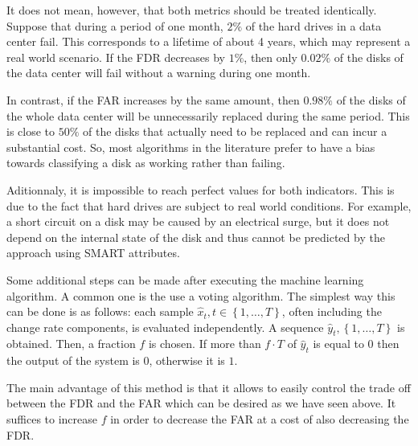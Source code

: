 It does not mean, however, that both metrics should be treated identically.
Suppose that during a period of one month, $2\%$ of the hard drives in a data center fail.
This corresponds to a lifetime of about 4 years, which may represent a real world scenario.
If the FDR decreases by $1\%$, then only $0.02\%$ of the disks of the data center will fail without a warning during one month.

In contrast, if the FAR increases by the same amount, then $0.98\%$ of the disks of the whole data center will be unnecessarily replaced during the same period.
This is close to $50\%$ of the disks that actually need to be replaced and can incur a substantial cost.
So, most algorithms in the literature prefer to have a bias towards classifying a disk as working rather than failing.

Aditionnaly, it is impossible to reach perfect values for both indicators.
This is due to the fact that hard drives are subject to real world conditions.
For example, a short circuit on a disk may be caused by an electrical surge, but it does not depend on the internal state of the disk and thus cannot be predicted by the approach using SMART attributes.

Some additional steps can be made after executing the machine learning algorithm.
A common one is the use a voting algorithm.
The simplest way this can be done is as follows\cite{Shen18}: each sample $\hat{x}_{t}, t\in\left\{1,\dots,T\right\}$, often including the change rate components, is evaluated independently.
A sequence $\hat{y}_t, \left\{1,\dots,T\right\}$ is obtained.
Then, a fraction $f$ is chosen.
If more than $f\cdot T$ of $\hat{y}_t$ is equal to $0$ then the output of the system is $0$, otherwise it is $1$.

The main advantage of this method is that it allows to easily control the trade off between the FDR and the FAR which can be desired as we have seen above.
It suffices to increase $f$ in order to decrease the FAR at a cost of also decreasing the FDR.
